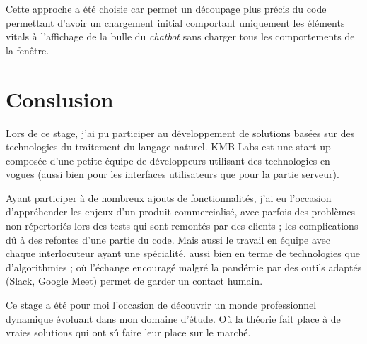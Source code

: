 \documentclass[12pt,a4paper,oneside]{scrreprt}
\begin{document}
\begin{result}
	Cette approche a été choisie car permet un découpage plus précis du code permettant d'avoir un chargement initial comportant uniquement les éléments vitals à l'affichage de la bulle du \textit{chatbot} sans charger tous les comportements de la fenêtre.
\end{result}

\chapter{Conslusion}

Lors de ce stage, j'ai pu participer au développement de solutions basées sur des technologies du traitement du langage naturel. KMB Labs est une start-up composée d'une petite équipe de développeurs utilisant des technologies en vogues (aussi bien pour les interfaces utilisateurs que pour la partie serveur).

Ayant participer à de nombreux ajouts de fonctionnalités, j'ai eu l'occasion d'appréhender les enjeux d'un produit commercialisé, avec parfois des problèmes non répertoriés lors des tests qui sont remontés par des clients ; les complications dû à des refontes d'une partie du code. Mais aussi le travail en équipe avec chaque interlocuteur ayant une spécialité, aussi bien en terme de technologies que d'algorithmies ; où l'échange encouragé malgré la pandémie par des outils adaptés (Slack, Google Meet) permet de garder un contact humain.

Ce stage a été pour moi l'occasion de découvrir un monde professionnel dynamique évoluant dans mon domaine d'étude. Où la théorie fait place à de vraies solutions qui ont sû faire leur place sur le marché.
\end{document}

